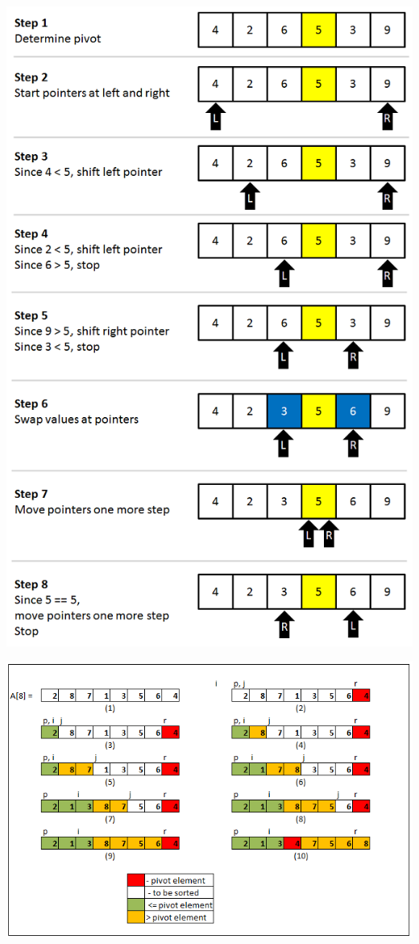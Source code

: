 \documentclass[a4paper,11pt,twoside]{book}
\begin{document}
\begin{center}
	\includegraphics[scale=0.45]{pics/qsort1.png} 
\end{center}

\begin{center}
	\includegraphics[scale=0.45]{pics/qsort2.png}
\end{center}
\end{document}
